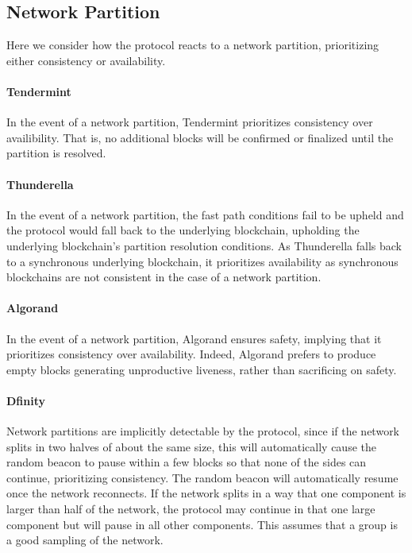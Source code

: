 \documentclass[10pt,journal,compsoc]{IEEEtran}
\begin{document}
\subsection{Network Partition}
Here we consider how the protocol reacts to a network partition, prioritizing either consistency or availability. 

\paragraph{Tendermint} In the event of a network partition, Tendermint prioritizes consistency over availibility. That is, no additional blocks will be confirmed or finalized until the partition is resolved. 

\paragraph{Thunderella} In the event of a network partition, the fast path conditions fail to be upheld and the protocol would fall back to the underlying blockchain, upholding the underlying blockchain's partition resolution conditions. As Thunderella falls back to a synchronous underlying blockchain, it prioritizes availability as synchronous blockchains are not consistent in the case of a network partition.   

\paragraph{Algorand}
In the event of a network partition, Algorand ensures safety, implying that it prioritizes consistency over availability. Indeed, Algorand prefers to produce empty blocks generating unproductive liveness, rather than sacrificing on safety.

\paragraph{Dfinity} Network partitions are implicitly detectable by the protocol, since if the network splits in two halves of about the same size, this will automatically cause the random beacon to pause within a few blocks so that none of the sides can continue, prioritizing consistency. The random beacon will automatically resume once the network reconnects. If the network splits in a way that one component is larger than half of the network, the protocol may continue in that one large component but will pause in all other components. This assumes that a group is a good sampling of the network. 
\end{document}
